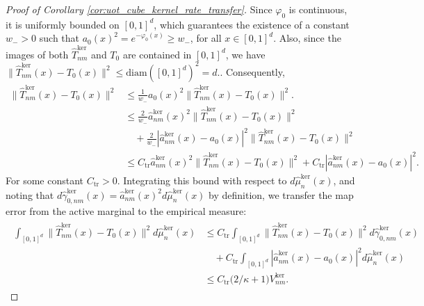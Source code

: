 \documentclass[11pt,reqno]{amsart}
\theoremstyle{definition}
\renewcommand{\hat}{\widehat}
\begin{document}
\begin{proof}[Proof of Corollary \ref{cor:uot_cube_kernel_rate_transfer}]
Since $\varphi_0$ is continuous, it is uniformly bounded on $[0,1]^d$, which guarantees the existence of a constant $w_- > 0$ such that $
    a_0(x)^2 = e^{-\varphi_0(x)} \ge w_-$, for all $x \in [0,1]^d$. Also, since the images of both $\hat T_{nm}^{\mathrm{ker}}$ and $T_0$ are contained in $[0,1]^d$, we have
$
    \|\hat T_{nm}^{\mathrm{ker}}(x) - T_0(x)\|^2 \le \mathrm{diam}([0,1]^d)^2 = d.
$. Consequently,
\begin{align}
\label{eq:helper_derivation_step1}
    \|\hat T_{nm}^{\mathrm{ker}}(x) - T_0(x)\|^2 
    &\le \frac{1}{w_-} a_0(x)^2 \|\hat T_{nm}^{\mathrm{ker}}(x) - T_0(x)\|^2. \\
    &\le \frac{2}{w_-} \hat a_{nm}^{\mathrm{ker}}(x)^2 \|\hat T_{nm}^{\mathrm{ker}}(x) - T_0(x)\|^2 \\
    &\quad + \frac{2}{w_-} | \hat a_{nm}^{\mathrm{ker}}(x) - a_0(x) |^2 \|\hat T_{nm}^{\mathrm{ker}}(x) - T_0(x)\|^2 \\
    &\le
    C_{\mathrm{tr}} \hat a_{nm}^{\mathrm{ker}}(x)^2 \|\hat T_{nm}^{\mathrm{ker}}(x)-T_0(x)\|^2
    +
    C_{\mathrm{tr}} |\hat a_{nm}^{\mathrm{ker}}(x)-a_0(x)|^2. 
\end{align}
For some constant $C_{\mathrm{tr}}>0$. Integrating this bound with respect to $d\hat\mu_n^{\mathrm{ker}}(x)$, and noting that $d\hat\gamma_{0,nm}^{\mathrm{ker}}(x) = \hat a_{nm}^{\mathrm{ker}}(x)^2 d\hat\mu_n^{\mathrm{ker}}(x)$ by definition, we transfer the map error from the active marginal to the empirical measure:
\begin{align}
\label{eq:uot_cube_kernel_T_to_mu_n}
\begin{aligned}
    \int_{[0,1]^d}
    \|\hat T_{nm}^{\mathrm{ker}}(x)-T_0(x)\|^2 d\hat\mu_n^{\mathrm{ker}}(x)
    &\le
    C_{\mathrm{tr}} \int_{[0,1]^d} \|\hat T_{nm}^{\mathrm{ker}}(x)-T_0(x)\|^2 d\hat\gamma_{0,nm}^{\mathrm{ker}}(x) \\
    &\quad + C_{\mathrm{tr}} \int_{[0,1]^d} |\hat a_{nm}^{\mathrm{ker}}(x)-a_0(x)|^2 d\hat\mu_n^{\mathrm{ker}}(x) \\
    &\le C_{\mathrm{tr}} \bigl( 2/\kappa + 1 \bigr) V_{nm}^{\mathrm{ker}}.
\end{aligned}
\end{align}


\end{proof}
\end{document}
